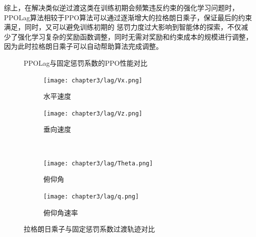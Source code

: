 综上，在解决类似逆过渡这类在训练初期会频繁违反约束的强化学习问题时，PPOLag算法相较于PPO算法可以通过逐渐增大的拉格朗日乘子，保证最后的约束满足，同时，又可以避免训练初期的
惩罚力度过大影响到智能体的探索，不仅减少了强化学习复杂的奖励函数调整，同时无需对奖励和约束成本的规模进行调整，因为此时拉格朗日乘子可以自动帮助算法完成调整。
\begin{figure}[H]
    \centering
    \hfill %
    \caption{PPOLag与固定惩罚系数的PPO性能对比} %
    \label{fig:PPOLag_and_FPO_comparison}
\end{figure}
\begin{figure}[H]
    \centering
    \begin{subfigure}{.45\textwidth}
        \centering
        \texttt{[image: chapter3/lag/Vx.png]}
        \caption{水平速度}
        \label{fig:vxcmp}
    \end{subfigure}%
    \hfill %
    \begin{subfigure}{.45\textwidth}
        \centering
        \texttt{[image: chapter3/lag/Vz.png]}
        \caption{垂向速度}
        \label{fig:vzcmp}
    \end{subfigure}
    \\
    \begin{subfigure}{.45\textwidth}
        \centering
        \texttt{[image: chapter3/lag/Theta.png]}
        \caption{俯仰角}
        \label{fig:vxcmp}
    \end{subfigure}%
    \hfill %
    \begin{subfigure}{.45\textwidth}
        \centering
        \texttt{[image: chapter3/lag/q.png]}
        \caption{俯仰角速率}
        \label{fig:vzcmp}
    \end{subfigure}
    \caption{拉格朗日乘子与固定惩罚系数过渡轨迹对比}
    \label{fig:lagcmp}
\end{figure}

